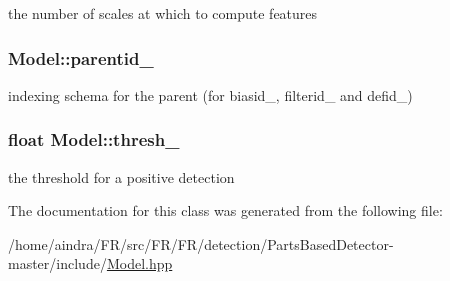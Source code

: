 the number of scales at which to compute features 

\hypertarget{classModel_a4e1151fe7911f52ec75944eff1b257f4}{
\subsubsection[{parentid\-\_\-}]{ {\bf \-Model\-::parentid\-\_\-}}}\label{classModel_a4e1151fe7911f52ec75944eff1b257f4}


indexing schema for the parent (for biasid\-\_\-, filterid\-\_\- and defid\-\_\-) 

\hypertarget{classModel_ac2263c14bbd27a5fed433494354e2b02}{
\subsubsection[{thresh\-\_\-}]{\setlength{\rightskip}{0pt plus 5cm}float {\bf \-Model\-::thresh\-\_\-}}}\label{classModel_ac2263c14bbd27a5fed433494354e2b02}


the threshold for a positive detection 



\-The documentation for this class was generated from the following file\-:\begin{DoxyCompactItemize}
\item 
/home/aindra/\-F\-R/src/\-F\-R/\-F\-R/detection/\-Parts\-Based\-Detector-\/master/include/\hyperlink{Model_8hpp}{\-Model.\-hpp}\end{DoxyCompactItemize}
